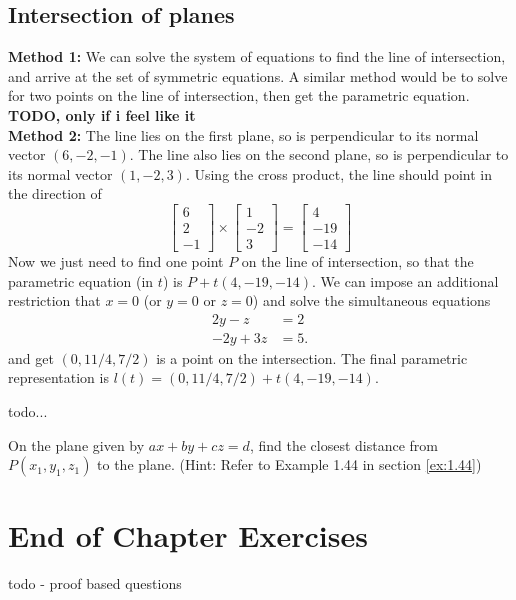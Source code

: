 \subsection{Intersection of planes}
\textbf{Method 1:} We can solve the system of equations to find the line of intersection, and arrive at the set of symmetric equations. A similar method would be to solve for two points on the line of intersection, then get the parametric equation. \textbf{TODO, only if i feel like it}\\

\textbf{Method 2:} The line lies on the first plane, so is perpendicular to its normal vector $(6,-2,-1)$. The line also lies on the second plane, so is perpendicular to its normal vector $(1,-2,3)$. Using the cross product, the line should point in the direction of \[
\begin{bmatrix}
	6\\2\\-1
\end{bmatrix} \times\begin{bmatrix}
1\\-2\\3
\end{bmatrix}=\begin{bmatrix}
4\\-19 \\ -14
\end{bmatrix}
\]
Now we just need to find one point $P$ on the line of intersection, so that the parametric equation (in $t$) is $P+t(4,-19,-14)$.
We can impose an additional restriction that $x=0$ (or $y=0$ or $z=0$) and solve the simultaneous equations\begin{align*}
	2y-z&=2\\
	-2y+3z&=5.
\end{align*}
and get $(0,11/4,7/2)$ is a point on the intersection. The final parametric representation is $l(t)=(0,11/4,7/2)+t(4,-19,-14)$.

\exercises
\begin{exerciselist}
	\item todo...
	\item On the plane given by $ax+by+cz=d$, find the closest distance from $P(x_1,y_1,z_1)$ to the plane. (Hint: Refer to Example 1.44 in section \ref{ex:1.44})
\end{exerciselist}

\section{End of Chapter Exercises}
\begin{exerciselist}
	\item todo - proof based questions
\end{exerciselist}
	

